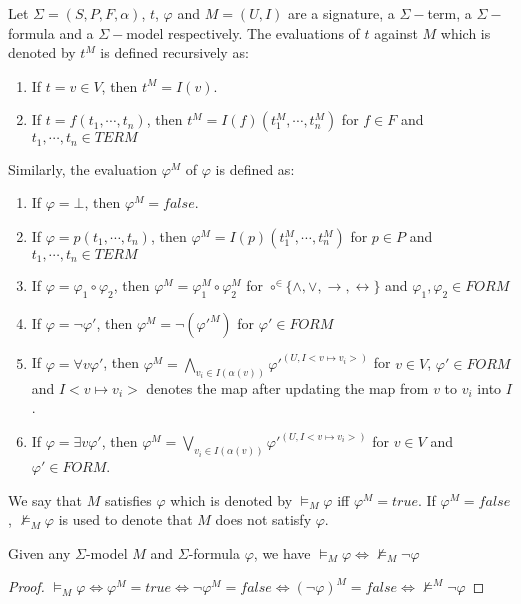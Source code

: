 \begin{definition}
Let $\Sigma = (S, P, F, \alpha)$, $t$, $\varphi$ and $M=(U, I)$ are a signature, a $\Sigma-$term, a $\Sigma-$formula and a $\Sigma-$model respectively. The evaluations of $t$ against $M$ which is denoted by $t^M$ is defined recursively as:
\begin{enumerate}
\item If $t = v \in V$, then $t^M = I(v)$.
\item If $t = f(t_1, \cdots, t_n)$, then $t^M = I(f)(t_1^M, \cdots, t_n^M)$ for $f \in F$ and $t_1,\cdots, t_n \in TERM$
\end{enumerate}
Similarly, the evaluation $\varphi^M$ of $\varphi$ is defined as:
\begin{enumerate}
\item If $\varphi = \bot$, then $\varphi^M = false$.
\item If $\varphi = p(t_1,\cdots,t_n)$, then $\varphi^M = I(p)(t_1^M,\cdots,t_n^M)$ for $p \in P$ and $t_1,\cdots, t_n \in TERM$
\item If $\varphi = \varphi_1 \circ \varphi_2$, then $\varphi^M = \varphi_1^M \circ \varphi_2^M$ for $\circ ^\in \{\wedge, \vee, \rightarrow, \leftrightarrow\}$ and $\varphi_1, \varphi_2 \in FORM$
\item If $\varphi = \neg\varphi'$, then $\varphi^M = \neg(\varphi'^M)$ for $\varphi' \in FORM$
\item If $\varphi = \forall v \varphi'$, then $\varphi^M = \bigwedge\limits_{v_i \in I(\alpha(v))}\varphi'^{(U, I<v \mapsto v_i>)}$ for $v \in V$,  $\varphi' \in FORM$ and $I<v \mapsto v_i>$ denotes the map after updating the map from $v$ to $v_i$ into $I$.
\item If $\varphi = \exists v \varphi'$, then $\varphi^M = \bigvee\limits_{v_i \in I(\alpha(v))}\varphi'^{(U, I<v \mapsto v_i>)}$ for $v \in V$ and  $\varphi' \in FORM$.
\end{enumerate}
We say that $M$ satisfies $\varphi$ which is denoted by $\models_M \varphi$ iff $\varphi^M = true$. If $\varphi^M = false$, $\not\models_M \varphi$ is used to denote that $M$ does not satisfy $\varphi$.
\end{definition}

\begin{lemma}\label{lemma:model-sat-unsat}
Given any $\Sigma$-model $M$ and $\Sigma$-formula $\varphi$, we have $\models_M \varphi \iff \not\models_M \neg \varphi$
\end{lemma}

\begin{proof}
$\models_M \varphi \iff \varphi^M = true \iff \neg \varphi^M = false \iff (\neg \varphi)^M = false \iff \not\models^M \neg \varphi$
\end{proof}

